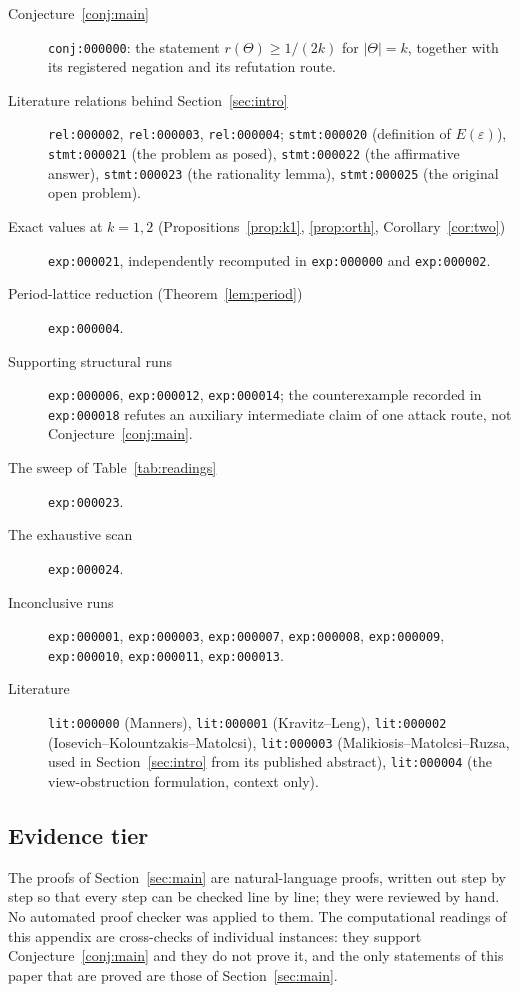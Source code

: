 \documentclass[11pt]{article}
\theoremstyle{plain}
\theoremstyle{definition}
\theoremstyle{remark}
\begin{document}
\begin{description}
\item[Conjecture~\ref{conj:main}] \texttt{conj:000000}: the statement $r(\Theta)\ge1/(2k)$ for
$|\Theta|=k$, together with its registered negation and its refutation route.
\item[Literature relations behind Section~\ref{sec:intro}] \texttt{rel:000002},
\texttt{rel:000003}, \texttt{rel:000004}; \texttt{stmt:000020} (definition of $E(\varepsilon)$),
\texttt{stmt:000021} (the problem as posed), \texttt{stmt:000022} (the affirmative answer),
\texttt{stmt:000023} (the rationality lemma), \texttt{stmt:000025} (the original open problem).
\item[Exact values at $k=1,2$ (Propositions~\ref{prop:k1}, \ref{prop:orth},
Corollary~\ref{cor:two})] \texttt{exp:000021}, independently recomputed in \texttt{exp:000000} and
\texttt{exp:000002}.
\item[Period-lattice reduction (Theorem~\ref{lem:period})] \texttt{exp:000004}.
\item[Supporting structural runs] \texttt{exp:000006}, \texttt{exp:000012}, \texttt{exp:000014}; the
counterexample recorded in \texttt{exp:000018} refutes an auxiliary intermediate claim of one attack
route, not Conjecture~\ref{conj:main}.
\item[The sweep of Table~\ref{tab:readings}] \texttt{exp:000023}.
\item[The exhaustive scan] \texttt{exp:000024}.
\item[Inconclusive runs] \texttt{exp:000001}, \texttt{exp:000003}, \texttt{exp:000007},
\texttt{exp:000008}, \texttt{exp:000009}, \texttt{exp:000010}, \texttt{exp:000011},
\texttt{exp:000013}.
\item[Literature] \texttt{lit:000000} (Manners), \texttt{lit:000001} (Kravitz--Leng),
\texttt{lit:000002} (Iosevich--Kolountzakis--Matolcsi), \texttt{lit:000003}
(Malikiosis--Matolcsi--Ruzsa, used in Section~\ref{sec:intro} from its published abstract),
\texttt{lit:000004} (the view-obstruction formulation, context only).
\end{description}

\subsection{Evidence tier}

The proofs of Section~\ref{sec:main} are natural-language proofs, written out step by step so that every
step can be checked line by line; they were reviewed by hand. No automated proof checker was applied to
them. The computational readings of this appendix are cross-checks of individual instances: they
support Conjecture~\ref{conj:main} and they do not prove it, and the only statements of this paper that
are proved are those of Section~\ref{sec:main}.
\end{document}
